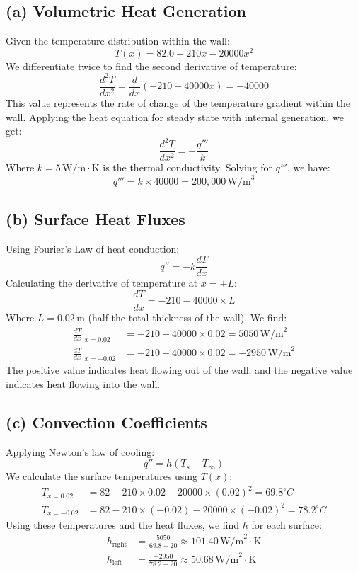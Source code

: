 \documentclass{article}
\begin{document}
\subsection*{(a) Volumetric Heat Generation}
Given the temperature distribution within the wall:
\[ T(x) = 82.0 - 210x - 20000x^2 \]
We differentiate twice to find the second derivative of temperature:
\[ \frac{d^2T}{dx^2} = \frac{d}{dx}(-210 - 40000x) = -40000 \]
This value represents the rate of change of the temperature gradient within the wall. Applying the heat equation for steady state with internal generation, we get:
\[ \frac{d^2T}{dx^2} = -\frac{q'''}{k} \]
Where \( k = 5 \, \text{W/m}\cdot\text{K} \) is the thermal conductivity. Solving for \(q'''\), we have:
\[ q''' = k \times 40000 = 200,000 \, \text{W/m}^3 \]

\subsection*{(b) Surface Heat Fluxes}
Using Fourier's Law of heat conduction:
\[ q'' = -k \frac{dT}{dx} \]
Calculating the derivative of temperature at \(x = \pm L\):
\[ \frac{dT}{dx} = -210 - 40000 \times L \]
Where \( L = 0.02 \, \text{m} \) (half the total thickness of the wall). We find:
\begin{align*}
\frac{dT}{dx} \bigg|_{x = 0.02} &= -210 - 40000 \times 0.02 = 5050 \, \text{W/m}^2 \\
\frac{dT}{dx} \bigg|_{x = -0.02} &= -210 + 40000 \times 0.02 = -2950 \, \text{W/m}^2
\end{align*}
The positive value indicates heat flowing out of the wall, and the negative value indicates heat flowing into the wall.

\subsection*{(c) Convection Coefficients}
Applying Newton's law of cooling:
\[ q'' = h (T_s - T_{\infty}) \]
We calculate the surface temperatures using \(T(x)\):
\begin{align*}
T_{x=0.02} &= 82 - 210 \times 0.02 - 20000 \times (0.02)^2 = 69.8^\circ C \\
T_{x=-0.02} &= 82 - 210 \times (-0.02) - 20000 \times (-0.02)^2 = 78.2^\circ C
\end{align*}
Using these temperatures and the heat fluxes, we find \( h \) for each surface:
\begin{align*}
h_{\text{right}} &= \frac{5050}{69.8 - 20} \approx 101.40 \, \text{W/m}^2\cdot\text{K} \\
h_{\text{left}} &= \frac{-2950}{78.2 - 20} \approx 50.68 \, \text{W/m}^2\cdot\text{K}
\end{align*}
\end{document}
